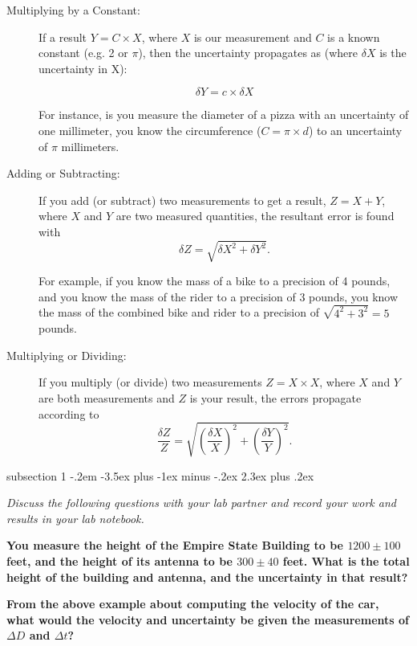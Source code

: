 \documentclass[12pt]{article}
\makeatletter
\newenvironment{problem}{\@startsection
       {subsection}
       {1}
       {-.2em}
       {-3.5ex plus -1ex minus -.2ex}
       {2.3ex plus .2ex}
       {\pagebreak[3]%
       \normalsize\bf\noindent{Problem }
       }
       }
       {%
       }
\makeatother
\begin{document}
\begin{description}
\item[Multiplying by a Constant:] If a result $Y = C \times X$, where $X$ is our measurement and $C$ is a known constant (e.g. 2 or $\pi$), then the uncertainty propagates as (where $\delta X$ is the uncertainty in X):

\begin{equation}
\delta Y = c \times \delta X
\end{equation}

For instance, is you measure the diameter of a pizza with an uncertainty of one millimeter, you know the circumference ($C = \pi \times d$) to an uncertainty of $\pi$ millimeters.

\item[Adding or Subtracting:] If you add (or subtract) two measurements to get a result, $Z = X + Y$, where $X$ and $Y$ are two measured quantities, the resultant error is found with
\begin{equation}
\delta Z = \sqrt{ \delta X^2 + \delta Y^2 }. 
\end{equation}

For example, if you know the mass of a bike to a precision of 4 pounds, and you know the mass of the rider to a precision of 3 pounds, you know the mass of the combined bike and rider to a precision of $\sqrt{4^2 + 3^2 } = 5$ pounds.

\item[Multiplying or Dividing:] If you multiply (or divide) two measurements $Z = X \times X$, where $X$ and $Y$ are both measurements and $Z$ is your result, the errors propagate according to
\begin{equation}
\frac{ \delta Z }{Z}= \sqrt{ \left( \frac{\delta X}{X} \right)^2 + \left( \frac{\delta Y}{Y} \right)^2 } .
\end{equation}
\end{description}

\begin{problem}{ }
	\begin{description}
		\item \textit{Discuss the following questions with your lab partner and record your work and results in your lab notebook.} 
		\item \textbf{You measure the height of the Empire State Building to be $1200 \pm 100$ feet, and the height of its antenna to be $300 \pm 40$ feet. What is the total height of the building and antenna, and the uncertainty in that result?}
		\item \textbf{From the above example about computing the velocity of the car, what would the velocity and uncertainty be given the measurements of $\Delta D$ and $\Delta t$?}
	\end{description}
\end{problem}
\end{document}
